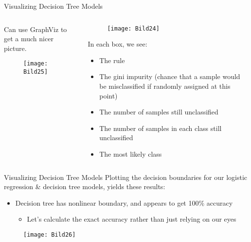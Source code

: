 \documentclass[aspectratio=169]{../latex_main/tntbeamer}  %
\begin{document}
	
	\begin{frame}{Visualizing Decision Tree Models }
	    \begin{columns}
	        \begin{column}{.4\textwidth}
	        Can use GraphViz to get a much nicer picture.
	                \begin{figure}
	                    \texttt{[image: Bild25]}
	                \end{figure}
	        \end{column}
	        
	        
	        \begin{column}{.6\textwidth}
	                \begin{figure}
	                    \texttt{[image: Bild24]}
	                \end{figure}
	                In each box, we see:
	                \begin{itemize}
	                    \item The rule
	                    \item The gini impurity (chance that a sample would be misclassified if randomly assigned at this point)
	                    \item The number of samples still unclassified
	                    \item The number of samples in each class still unclassified
	                    \item The most likely class
	                \end{itemize}
	        \end{column}
	    \end{columns}
	\end{frame}
	
	
	\begin{frame}{Visualizing Decision Tree Models}
	    Plotting the decision boundaries for our logistic regression \& decision tree models, yields these results:
	    \begin{itemize}
	        \item Decision tree has nonlinear boundary, and appears to get 100\% accuracy
	        \begin{itemize}
	            \item Let’s calculate the exact accuracy rather than just relying on our eyes
	        \end{itemize}
	    \end{itemize}
	    \begin{figure}
	        \centering
	        \texttt{[image: Bild26]}
	    \end{figure}
	\end{frame}
	
\end{document}
